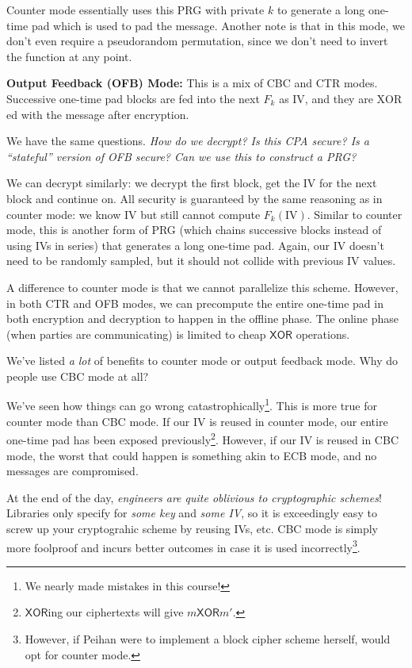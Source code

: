 Counter mode essentially uses this PRG with private $k$ to generate a long one-time pad which is used to pad the message. Another note is that in this mode, we don't even require a pseudorandom permutation, since we don't need to invert the function at any point.

\textbf{Output Feedback (OFB) Mode:} This is a mix of CBC and CTR modes. Successive one-time pad blocks are fed into the next $F_k$ as IV, and they are $\mathrm{XOR}$ed with the message after encryption.


We have the same questions. \emph{How do we decrypt? Is this CPA secure? Is a ``stateful'' version of OFB secure? Can we use this to construct a PRG?}

We can decrypt similarly: we decrypt the first block, get the IV for the next block and continue on. All security is guaranteed by the same reasoning as in counter mode: we know IV but still cannot compute $F_k(\mathrm{IV})$. Similar to counter mode, this is another form of PRG (which chains successive blocks instead of using IVs in series) that generates a long one-time pad. Again, our IV doesn't need to be randomly sampled, but it should not collide with previous IV values.

A difference to counter mode is that we cannot parallelize this scheme. However, in both CTR and OFB modes, we can precompute the entire one-time pad in both encryption and decryption to happen in the offline phase. The online phase (when parties are communicating) is limited to cheap $\mathsf{XOR}$ operations.

\begin{ques*}
    We've listed \emph{a lot} of benefits to counter mode or output feedback mode. Why do people use CBC mode at all?
\end{ques*}
We've seen how things can go wrong catastrophically\footnote{We nearly made mistakes in this course!}. This is more true for counter mode than CBC mode. If our IV is reused in counter mode, our entire one-time pad has been exposed previously\footnote{$\mathsf{XOR}$ing our ciphertexts will give $m \mathsf{XOR} m'$.}. However, if our IV is reused in CBC mode, the worst that could happen is something akin to ECB mode, and no messages are compromised.

At the end of the day, \emph{engineers are quite oblivious to cryptographic schemes}! Libraries only specify for \emph{some key} and \emph{some IV}, so it is exceedingly easy to screw up your cryptograhic scheme by reusing IVs, etc. CBC mode is simply more foolproof and incurs better outcomes in case it is used incorrectly\footnote{However, if Peihan were to implement a block cipher scheme herself, would opt for counter mode.}.

